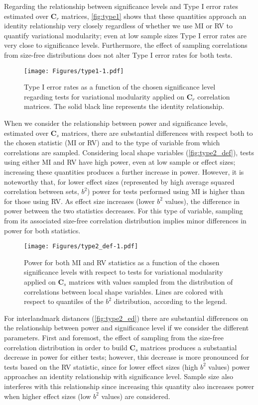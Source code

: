 \documentclass[12pt,]{article}
\begin{document}
Regarding the relationship between significance levels and Type I error
rates estimated over $\mathbf{C}_r$ matrices, \autoref{fig:type1} shows
that these quantities approach an identity relationship very closely
regardless of whether we use MI or RV to quantify variational
modularity; even at low sample sizes Type I error rates are very close
to significance levels. Furthermore, the effect of sampling correlations
from size-free distributions does not alter Type I error rates for both
tests.

\begin{figure}[htbp]
\centering
\texttt{[image: Figures/type1-1.pdf]}
\caption{Type I error rates as a function of the chosen significance
level regarding tests for variational modularity applied on
$\mathbf{C}_r$ correlation matrices. The solid black line represents the
identity relationship. \label{fig:type1}}
\end{figure}

When we consider the relationship between power and significance levels,
estimated over $\mathbf{C}_s$ matrices, there are substantial
differences with respect both to the chosen statistic (MI or RV) and to
the type of variable from which correlations are sampled. Considering
local shape variables (\autoref{fig:type2_def}), tests using either MI
and RV have high power, even at low sample or effect sizes; increasing
these quantities produces a further increase in power. However, it is
noteworthy that, for lower effect sizes (represented by high average
squared correlation between sets, $b^2$) power for tests performed using
MI is higher than for those using RV. As effect size increases (lower
$b^2$ values), the difference in power between the two statistics
decreases. For this type of variable, sampling from its associated
size-free correlation distribution implies minor differences in power
for both statistics.

\begin{figure}[htbp]
\centering
\texttt{[image: Figures/type2\_def-1.pdf]}
\caption{Power for both MI and RV statistics as a function of the chosen
significance levels with respect to tests for variational modularity
applied on $\mathbf{C}_s$ matrices with values sampled from the
distribution of correlations between local shape variables. Lines are
colored with respect to quantiles of the $b^2$ distribution, according
to the legend. \label{fig:type2_def}}
\end{figure}

For interlandmark distances (\autoref{fig:type2_ed}) there are
substantial differences on the relationship between power and
significance level if we consider the different parameters. First and
foremost, the effect of sampling from the size-free correlation
distribution in order to build $\mathbf{C}_s$ matrices produces a
substantial decrease in power for either tests; however, this decrease
is more pronounced for tests based on the RV statistic, since for lower
effect sizes (high $b^2$ values) power approaches an identity
relationship with significance level. Sample size also interferes with
this relationship since increasing this quantity also increases power
when higher effect sizes (low $b^2$ values) are considered.
\end{document}
